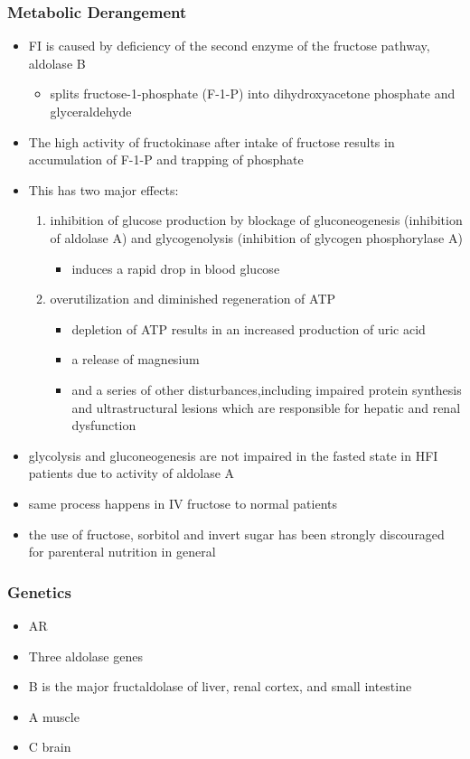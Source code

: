 \documentclass{scrartcl}
\begin{document}
\subsubsection{Metabolic Derangement}
\label{sec:orge184711}
\begin{itemize}
\item FI is caused by deficiency of the second enzyme of the fructose pathway, aldolase B
\begin{itemize}
\item splits fructose-1-phosphate (F-1-P) into dihydroxyacetone phosphate and glyceraldehyde
\end{itemize}
\item The high activity of fructokinase after intake of fructose results in accumulation of F-1-P and trapping of phosphate
\item This has two major effects:
\begin{enumerate}
\item inhibition of glucose production by blockage of gluconeogenesis
(inhibition of aldolase A) and glycogenolysis (inhibition of glycogen phosphorylase A)
\begin{itemize}
\item induces a rapid drop in blood glucose
\end{itemize}
\item overutilization and diminished regeneration of ATP
\begin{itemize}
\item depletion of ATP results in an increased production of uric acid
\item a release of magnesium
\item and a series of other disturbances,including impaired protein
synthesis and ultrastructural lesions which are responsible for
hepatic and renal dysfunction
\end{itemize}
\end{enumerate}
\item glycolysis and gluconeogenesis are not impaired in the fasted state in HFI patients due to activity of aldolase A

\item same process happens in IV fructose to normal patients
\item the use of fructose, sorbitol and invert sugar has been strongly discouraged for parenteral nutrition in general
\end{itemize}

\subsubsection{Genetics}
\label{sec:orgf2c10eb}
\begin{itemize}
\item AR
\item Three aldolase genes
\item B is the major fructaldolase of liver, renal cortex, and small intestine
\item A muscle
\item C brain
\end{itemize}
\end{document}
